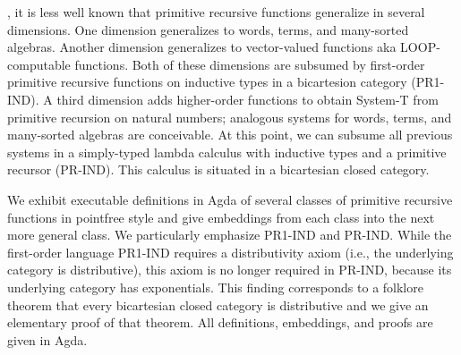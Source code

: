 \documentclass[a4paper,USenglish,cleveref, autoref, thm-restate]{lipics-v2021}
\begin{document}
, it is less well known that primitive recursive
functions generalize in several dimensions. One dimension generalizes
to words, terms, and many-sorted algebras. Another dimension
generalizes to vector-valued functions aka LOOP-computable
functions. Both of these dimensions are 
subsumed by first-order primitive recursive functions on inductive
types in a bicartesion category (PR1-IND). 
A third dimension adds higher-order functions to obtain System-T from
primitive recursion on natural numbers; analogous systems for
words, terms, and many-sorted algebras are conceivable. At this point, we can subsume
all previous systems in a simply-typed lambda calculus with
inductive types and a primitive recursor (PR-IND). This calculus is
situated in a bicartesian closed category.

We exhibit executable definitions in Agda of several classes of primitive
recursive functions in pointfree style and give embeddings from each
class into the next more general class. We particularly emphasize
PR1-IND and PR-IND.
While the first-order language PR1-IND requires a distributivity axiom
(i.e., the underlying category is distributive), this axiom is no
longer required in PR-IND, because its underlying category has
exponentials.
This finding corresponds to a folklore theorem that every bicartesian
closed category is distributive and we give an elementary proof of
that theorem.
All definitions, embeddings, and proofs are given in Agda.





\end{document}
